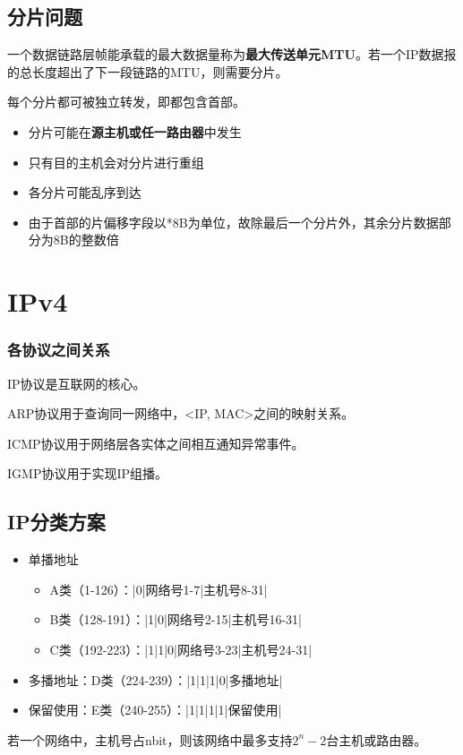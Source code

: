 \subsection{分片问题}
一个数据链路层帧能承载的最大数据量称为\textbf{最大传送单元MTU}。若一个IP数据报的总长度超出了下一段链路的MTU，则需要分片。

每个分片都可被独立转发，即都包含首部。
\begin{itemize}
    \item 分片可能在\textbf{源主机或任一路由器}中发生
    \item 只有目的主机会对分片进行重组
    \item 各分片可能乱序到达
    \item 由于首部的片偏移字段以*8B为单位，故除最后一个分片外，其余分片数据部分为8B的整数倍
\end{itemize}


\section{IPv4}

\subsubsection{各协议之间关系}

IP协议是互联网的核心。

ARP协议用于查询同一网络中，<IP, MAC>之间的映射关系。

ICMP协议用于网络层各实体之间相互通知异常事件。

IGMP协议用于实现IP组播。


\subsection{IP分类方案}
\begin{itemize}
    \item 单播地址\begin{itemize}
        \item A类（1-126）：|0|网络号1-7|主机号8-31|
        \item B类（128-191）：|1|0|网络号2-15|主机号16-31|
        \item C类（192-223）：|1|1|0|网络号3-23|主机号24-31|
    \end{itemize}
    \item 多播地址：D类（224-239）：|1|1|1|0|多播地址|
    \item 保留使用：E类（240-255）：|1|1|1|1|保留使用|
\end{itemize}
若一个网络中，主机号占nbit，则该网络中最多支持\(2^n - 2\)台主机或路由器。

